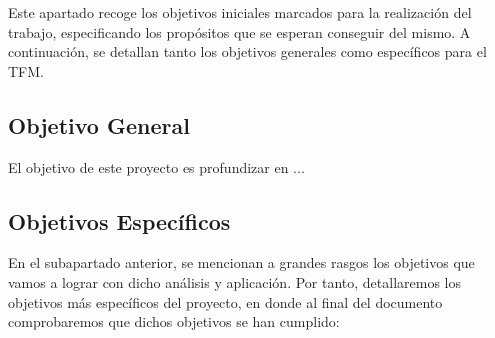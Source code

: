 Este apartado recoge los objetivos iniciales marcados para la realización del trabajo, especificando los propósitos que se esperan conseguir del mismo. A continuación, se detallan tanto los objetivos generales como específicos para el TFM.

\subsection{Objetivo General}

El objetivo de este proyecto es profundizar en ...

\subsection{Objetivos Específicos}



En el subapartado anterior, se mencionan a grandes rasgos los objetivos que vamos a lograr con dicho análisis y aplicación. Por tanto, detallaremos los objetivos más específicos del proyecto, en donde al final del documento comprobaremos que dichos objetivos se han cumplido:


